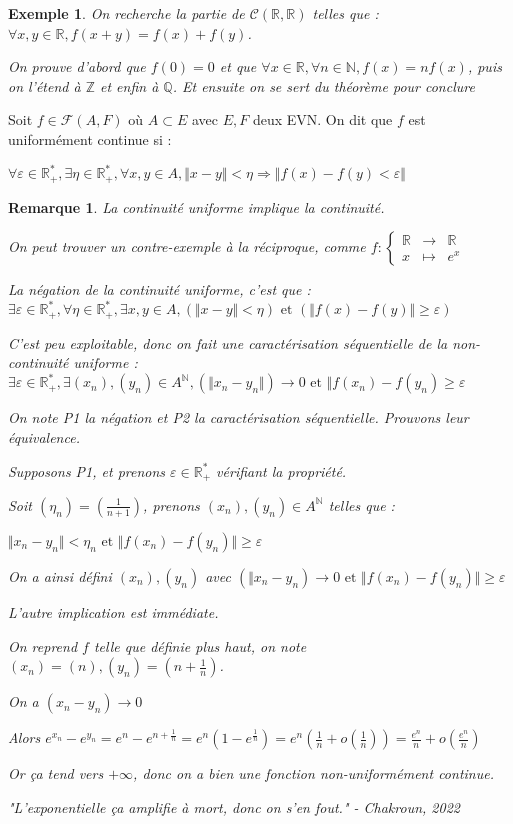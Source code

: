 \documentclass[a4paper,12pt]{book}
\newcommand{\Def}[2]{\begin{tcolorbox}[sharp corners, colback=white,colframe=blue!90!black!75, title=Définition : #1]#2\end{tcolorbox}}
\newtheorem{Exe}{Exemple}[section]
\newtheorem{Rem}{Remarque}[section]
\def\R{\mathbb{R}}
\def\Q{\mathbb{Q}}
\def\N{\mathbb{N}}
\def\Z{\mathbb{Z}}
\begin{document}
\begin{Exe}
On recherche la partie de $\mathcal{C}(\R,\R)$ telles que : $\forall x,y\in\R, f(x+y)=f(x)+f(y)$. \par On prouve d'abord que $f(0)=0$ et que $\forall x\in\R,\forall n\in\N, f(x)=nf(x)$, puis on l'étend à $\Z$ et enfin à $\Q$. Et ensuite on se sert du théorème pour conclure
\end{Exe}
\Def{Uniforme continuité}{Soit $f\in\mathcal{F}(A,F)$ où $A\subset E$ avec $E,F$ deux EVN. On dit que $f$ est uniformément continue si :
\par\begin{center} $\forall\varepsilon\in\R_+^*,\exists\eta\in\R_+^*,\forall x,y\in A,\Vert x-y\Vert<\eta\Rightarrow\Vert f(x)-f(y)<\varepsilon\Vert$\end{center}}
\begin{Rem}
La continuité uniforme implique la continuité. \par On peut trouver un contre-exemple à la réciproque, comme $f:\left\{\begin{array}{rcl} \R & \to & \R \\ x & \mapsto & e^x\end{array}\right.$ \par La négation de la continuité uniforme, c'est que : $\exists\varepsilon\in\R_+^*,\forall\eta\in\R_+^*,\exists x,y\in A, (\Vert x-y\Vert<\eta)\text{ et }(\Vert f(x)-f(y)\Vert\geq\varepsilon)$
\par C'est peu exploitable, donc on fait une caractérisation séquentielle de la non-continuité uniforme : $\exists\varepsilon\in\R_+^*,\exists(x_n),(y_n)\in A^\N, (\Vert x_n-y_n\Vert)\to 0\text{ et }\Vert f(x_n)-f(y_n)\geq\varepsilon$ \par On note P1 la négation et P2 la caractérisation séquentielle. Prouvons leur équivalence. \par Supposons P1, et prenons $\varepsilon\in\R_+^*$ vérifiant la propriété. 
\par Soit $(\eta_n)=(\frac{1}{n+1})$, prenons $(x_n), (y_n)\in A^\N$ telles que :\par $\Vert x_n-y_n\Vert<\eta_n\text{ et }\Vert f(x_n)-f(y_n)\Vert\geq\varepsilon$ \par On a ainsi défini $(x_n),(y_n)$ avec $(\Vert x_n-y_n)\to 0\text{ et }\Vert f(x_n)-f(y_n)\Vert\geq\varepsilon$
\par L'autre implication est immédiate. \par On reprend $f$ telle que définie plus haut, on note $(x_n)=(n), (y_n)=(n+\frac{1}{n})$. \par On a $(x_n-y_n)\to 0$ 
\par Alors $e^{x_n}-e^{y_n}=e^{n}-e^{n+\frac{1}{n}}=e^{n}(1-e^{\frac{1}{n}})=e^{n}(\frac{1}{n}+o(\frac{1}{n}))=\frac{e^{n}}{n}+o(\frac{e^{n}}{n})$ \par Or ça tend vers $+\infty$, donc on a bien une fonction non-uniformément continue.
\par "L'exponentielle ça amplifie à mort, donc on s'en fout." - Chakroun, 2022
\end{Rem}
\end{document}
